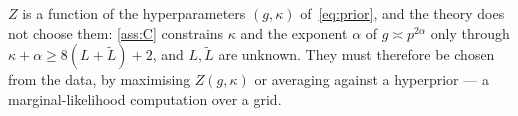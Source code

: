 \documentclass[aos]{imsart}
\newcommand{\Ltil}{\widetilde{L}}
\theoremstyle{plain}
\theoremstyle{definition}
\begin{document}
    $Z$ is a function of the hyperparameters $(g,\kappa)$
    of~\eqref{eq:prior}, and the theory does not choose them: \cref{ass:C}
    constrains $\kappa$ and the exponent $\alpha$ of $g\asymp p^{2\alpha}$
    only through $\kappa+\alpha\geq8(L+\Ltil)+2$, and $L,\Ltil$ are unknown.
    They must therefore be chosen from the data, by maximising $Z(g,\kappa)$
    or averaging against a hyperprior --- a marginal-likelihood computation
    over a grid.

%


\end{document}
